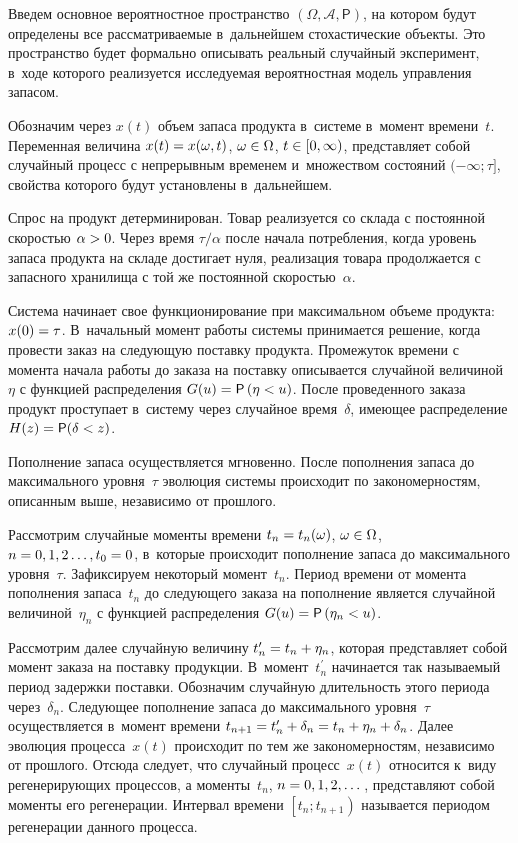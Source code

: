 \begin{multicols}{2}
Введем основное вероятностное пространство $(\Omega,\mathcal{A},\mathsf{P})$, на 
котором будут определены все рас\-смат\-ри\-ва\-емые в~дальнейшем стохастические 
объекты. Это пространство будет формально описывать реальный случайный 
эксперимент, в~ходе которого реализуется исследуемая вероятностная модель 
управления запасом.

Обозначим через $x(t)$ объем запаса продукта в~системе в~момент времени~$t$. 
Переменная величина $x(t)\hm=x(\omega,t)$, $\omega\hm\in\Omega$, $t\hm\in[0,\infty)$, 
представляет собой случайный процесс с непрерывным временем и~множеством 
состояний $(-\infty;\tau]$, свойства которого будут установлены в~дальнейшем.

Спрос на продукт детерминирован. Товар реализуется со склада с постоянной 
ско\-ростью $\alpha\hm>0$. Через время ${\tau}/{\alpha}$ после начала 
потребления, когда уровень запаса продукта на складе достигает нуля, реализация 
товара продолжается с запасного хранилища с той же постоянной ско\-ростью~$\alpha$.

Система начинает свое функционирование при максимальном объеме продукта: 
$x(0)\hm=\tau$. В~начальный момент работы системы принимается решение, когда 
провести заказ на следующую поставку продукта. Промежуток времени с момента 
начала работы до заказа на поставку описывается случайной величиной~$\eta$ с 
функцией распределения $G(u)\hm=\mathsf{P}\left(\eta\hm<u\right)$. После проведенного 
заказа продукт проступает в~систему через случайное время~$\delta$, имеющее 
распределение $H(z)\hm=\mathsf{P}(\delta\hm<z)$.

Пополнение запаса осуществляется мгновенно. После пополнения запаса до 
максимального уровня~$\tau$ эволюция системы происходит по закономерностям, 
описанным выше, независимо от прош\-лого.

Рассмотрим случайные моменты времени 
$t_n\hm=t_n(\omega)$, $\omega\hm\in\Omega$, $n\hm=0,1,2\ldots,t_0\hm=0$, в~которые происходит 
пополнение запаса до максимального уровня~$\tau$. Зафиксируем некоторый 
момент~$t_n$. Период времени от момента пополнения запаса~$t_n$ до следующего заказа на 
пополнение является случайной величиной~$\eta_n$ с функцией распределения 
$G(u)\hm=\mathsf{P}\left(\eta_n\hm<u\right)$.

Рассмотрим далее случайную величину $t_n^\prime\hm=t_n\hm+\eta_n$, которая 
представляет собой момент заказа на поставку продукции. В~момент~$t_n^\prime$ 
начинается\linebreak
 так называемый период задержки поставки. Обозначим случайную 
длительность этого периода через~$\delta_n$. Следующее пополнение запаса до 
максимального уровня~$\tau$ осуществляется в~момент \mbox{времени} 
$t_{n+1}\hm=t_n^\prime\hm+\delta_n\hm=t_n\hm+\eta_n\hm+\delta_n$. Далее эволюция процесса~$x(t)$ 
происходит по тем же закономерностям, независимо от прошлого. Отсюда 
следует, что случайный процесс~$x(t)$ относится к~виду ре\-ге\-не\-ри\-ру\-ющих процессов, 
а моменты~$t_n$, $n\hm=0,1,2,\dots$, представляют собой моменты его регенерации. 
Интервал времени $\left[t_n;t_{n+1}\right)$ называется периодом регенерации 
данного процесса.


\end{multicols}
